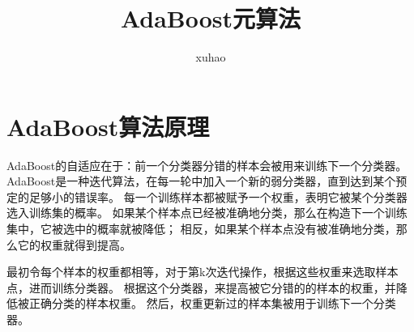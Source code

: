 \documentclass{article}
\begin{document}
\title{AdaBoost元算法}
\author{xuhao}
\maketitle

\setcounter{page}{1}
\setlength{\baselineskip}{14pt}

\section{AdaBoost算法原理}
AdaBoost的自适应在于：前一个分类器分错的样本会被用来训练下一个分类器。
AdaBoost是一种迭代算法，在每一轮中加入一个新的弱分类器，直到达到某个预定的足够小的错误率。
每一个训练样本都被赋予一个权重，表明它被某个分类器选入训练集的概率。
如果某个样本点已经被准确地分类，那么在构造下一个训练集中，它被选中的概率就被降低；
相反，如果某个样本点没有被准确地分类，那么它的权重就得到提高。


最初令每个样本的权重都相等，对于第k次迭代操作，根据这些权重来选取样本点，进而训练分类器。
根据这个分类器，来提高被它分错的的样本的权重，并降低被正确分类的样本权重。
然后，权重更新过的样本集被用于训练下一个分类器。
\end{document}
